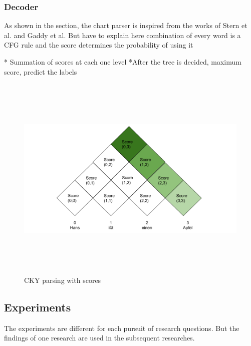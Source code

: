 \documentclass[a4paper, 11pt]{article}
\begin{document}
\subsubsection{Decoder}
As shown in the section, the chart parser is inspired from the works of Stern et al. and Gaddy et al. But have to explain here combination of every word is a CFG rule and the score determines the probability of using it

* Summation of scores at each one level
*After the tree is decided, maximum score, predict the labels



\begin{figure}[htpb]
    \centering
    \includegraphics[width=\textwidth,height=10cm,keepaspectratio=true]
    {cky-parsing-chart-3.png}
    \caption{
        CKY parsing with scores
    }
    \label{fig:CKY}
\end{figure}



\subsection{Experiments}

The experiments are different for each pursuit of research questions. But the findings of one research are used in the subsequent researches. 
\end{document}
